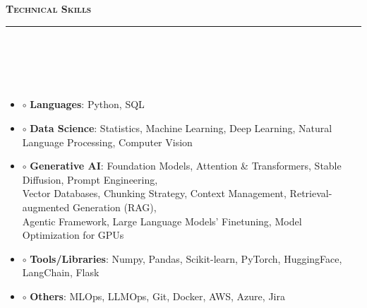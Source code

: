 \documentclass[a4paper,10pt]{article}
\makeatletter
\newcommand{\lsep}{-0.5cm}
\newcommand{\resheading}[1]{{\small
        {
            \begin{minipage}
                {0.992\textwidth}\textbf{{\textsc{#1 \vphantom{p\^{E}} }}}
                \\[-0.3cm]
                \hrule
            \end{minipage}
            \\[-0.5cm]
        }
 }}
\newcommand{\resEduHeading}[6]{
  \begin{tabular*}{7.1in}{l @{\extracolsep{\fill}} r}
    \textbf{\normalsize #1} \\
    \textit{#2} & \textit{#3} \\
    {\normalsize #4} & \textit{{#5} \textbf{#6}}
  \end{tabular*}
}
\makeatother
\begin{document}

\vspace{-4pt}
\noindent
\resheading{\textbf{\large Technical Skills}}\\[\lsep] 
\\[-0.3cm]


\begin{itemize}
  \item[] $\circ$ \hspace{0.0cm} \textbf{Languages}: Python, SQL\\[-0.55cm]
  \item[] $\circ$  \hspace{0.0cm} \textbf{Data Science}: Statistics, Machine Learning, Deep Learning, Natural Language Processing, Computer Vision  \\[-0.55cm]
  \item[] $\circ$  \hspace{0.0cm} \textbf{Generative AI}: Foundation Models, Attention \& Transformers, Stable Diffusion, Prompt Engineering, \\ \hspace*{0.3cm} Vector Databases, Chunking Strategy, Context Management, Retrieval-augmented Generation (RAG), \\ \hspace*{0.3cm} Agentic Framework, Large Language Models' Finetuning, Model Optimization for GPUs \\[-0.55cm]
  \item[] $\circ$  \hspace{0.0cm} \textbf{Tools/Libraries}: Numpy, Pandas, Scikit-learn, PyTorch, HuggingFace, LangChain, Flask \\[-0.55cm]
  \item[] $\circ$  \hspace{0.0cm} \textbf{Others}: MLOps, LLMOps, Git, Docker, AWS, Azure, Jira
\end{itemize}
\end{document}
